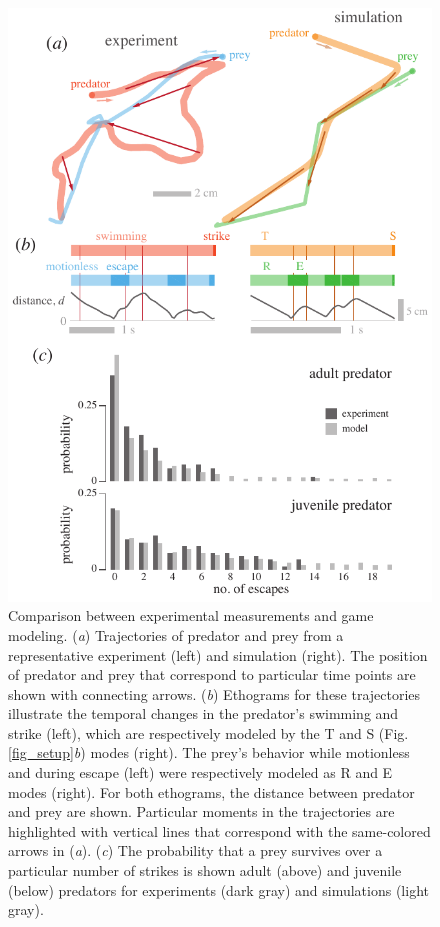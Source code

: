 \documentclass[]{rsos}%
\begin{document}
\begin{figure}[!h]
\centering
	\includegraphics[width=4.5in]{fig_trajectories}
\caption{
Comparison between experimental measurements and game modeling. 
(\textit{a}) Trajectories of predator and prey from a representative experiment (left) and simulation (right). 
The position of predator and prey that correspond to particular time points are shown with connecting arrows.
(\textit{b}) Ethograms for these trajectories illustrate the temporal changes in the predator's swimming and strike (left), which are respectively modeled by the T and S (Fig. \ref{fig_setup}\textit{b}) modes (right). 
The prey's behavior while motionless and during escape (left) were respectively modeled as R and E modes (right).
For both ethograms, the distance between predator and prey are shown.
Particular moments in the trajectories are highlighted with vertical lines that correspond with the same-colored arrows in (\textit{a}).
(\textit{c}) The probability that a prey survives over a particular number of strikes is shown adult  (above) and juvenile (below) predators for experiments (dark gray) and simulations (light gray).   
}
\label{fig_traj}
\end{figure}
\end{document}
